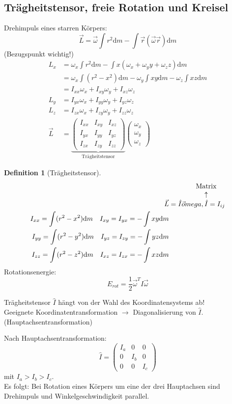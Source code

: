 \documentclass[a4paper]{scrartcl}
\renewcommand{\d}{\mathrm{d}}
\renewcommand{\v}[1]{\vec{#1}}
\theoremstyle{definition}
\newtheorem{defn}{Definition}
\theoremstyle{plain}
\theoremstyle{plain}
\theoremstyle{remark}
\theoremstyle{remark}
\theoremstyle{remark}
\begin{document}
\subsection{Trägheitstensor, freie Rotation und Kreisel}
\label{sec-8-8}
Drehimpuls eines starren Körpers:
\[\v L = \v \omega \int r^2 \d m - \int \v r (\v \omega \v r) \d m\]
(Bezugspunkt wichtig!)
\begin{align*}
L_x &= \omega_x \int r^2 \d m - \int x (\omega_x + \omega_y y + \omega_z z) \d m \\
&= \omega_x \int (r^2 - x^2) \d m - \omega_y \int xy \d m - \omega_z \int xz \d m \\
&= I_{xx} \omega_x + I_{xy} \omega_y + I_{xz} \omega_z \\
L_y &= I_{yx} \omega_x + I_{yy} \omega_y + I_{yz} \omega_z \\
L_z &= I_{zx} \omega_x + I_{zy} \omega_y + I_{zz} \omega_z \\
\v L &= \underbrace{\begin{pmatrix}
I_{xx} & I_{xy} & I_{xz} \\
I_{yx} & I_{yy} & I_{yz} \\
I_{zx} & I_{zy} & I_{zz}
\end{pmatrix}}_{\text{Trägheitstensor}}
\begin{pmatrix}
\omega_x \\
\omega_y \\
\omega_z
\end{pmatrix}
\end{align*}
\begin{defn}[Trägheitstensor]
\begin{align*}
\v L &= \hat I \v omega, \overarrow[\hat I]{Matrix} = I_{ij} \\
I_{xx} = \int (r^2 - x^2) \d m \quad I_{xy} = I_{yx} = -\int xy \d m \\
I_{yy} = \int (r^2 - y^2) \d m \quad I_{yz} = I_{zy} = -\int yz \d m \\
I_{zz} = \int (r^2 - z^2) \d m \quad I_{xz} = I_{zx} = -\int xz \d m
\end{align*}
Rotationsenergie:
\[E_{rot} = \frac{1}{2} \v \omega^{T} \hat I \v \omega\]
\end{defn}
Trägheitstensor $\hat I$ hängt von der Wahl des Koordinatensystems ab! \\
   Geeignete Koordinatentransformation $\rightarrow$ Diagonalisierung von $\hat I$. (Hauptachsentransformation)

Nach Hauptachsentransformation:
\[\hat I = \begin{pmatrix} I_a & 0 & 0 \\ 0 & I_b & 0 \\ 0 & 0 & I_c \end{pmatrix}\]
mit $I_a > I_b > I_c$. \\
   Es folgt: Bei Rotation eines Körpers um eine der drei Hauptachsen sind Drehimpuls und Winkelgeschwindigkeit parallel.
\end{document}
